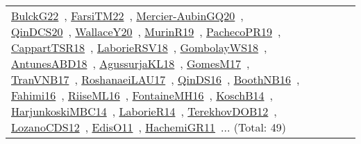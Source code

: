 {\begin{longtable}{lp{3cm}>{\raggedright\arraybackslash}p{6cm}>{\raggedright\arraybackslash}p{6cm}>{\raggedright\arraybackslash}p{8cm}}
\href{../works/BulckG22.pdf}{BulckG22}~\cite{BulckG22}, \href{../works/FarsiTM22.pdf}{FarsiTM22}~\cite{FarsiTM22}, \href{../works/Mercier-AubinGQ20.pdf}{Mercier-AubinGQ20}~\cite{Mercier-AubinGQ20}, \href{../works/QinDCS20.pdf}{QinDCS20}~\cite{QinDCS20}, \href{../works/WallaceY20.pdf}{WallaceY20}~\cite{WallaceY20}, \href{../works/MurinR19.pdf}{MurinR19}~\cite{MurinR19}, \href{../works/PachecoPR19.pdf}{PachecoPR19}~\cite{PachecoPR19}, \href{../works/CappartTSR18.pdf}{CappartTSR18}~\cite{CappartTSR18}, \href{../works/LaborieRSV18.pdf}{LaborieRSV18}~\cite{LaborieRSV18}, \href{../works/GombolayWS18.pdf}{GombolayWS18}~\cite{GombolayWS18}, \href{../works/AntunesABD18.pdf}{AntunesABD18}~\cite{AntunesABD18}, \href{../works/AgussurjaKL18.pdf}{AgussurjaKL18}~\cite{AgussurjaKL18}, \href{../works/GomesM17.pdf}{GomesM17}~\cite{GomesM17}, \href{../works/TranVNB17.pdf}{TranVNB17}~\cite{TranVNB17}, \href{../works/RoshanaeiLAU17.pdf}{RoshanaeiLAU17}~\cite{RoshanaeiLAU17}, \href{../works/QinDS16.pdf}{QinDS16}~\cite{QinDS16}, \href{../works/BoothNB16.pdf}{BoothNB16}~\cite{BoothNB16}, \href{../works/Fahimi16.pdf}{Fahimi16}~\cite{Fahimi16}, \href{../works/RiiseML16.pdf}{RiiseML16}~\cite{RiiseML16}, \href{../works/FontaineMH16.pdf}{FontaineMH16}~\cite{FontaineMH16}, \href{../works/KoschB14.pdf}{KoschB14}~\cite{KoschB14}, \href{../works/HarjunkoskiMBC14.pdf}{HarjunkoskiMBC14}~\cite{HarjunkoskiMBC14}, \href{../works/LaborieR14.pdf}{LaborieR14}~\cite{LaborieR14}, \href{../works/TerekhovDOB12.pdf}{TerekhovDOB12}~\cite{TerekhovDOB12}, \href{../works/LozanoCDS12.pdf}{LozanoCDS12}~\cite{LozanoCDS12}, \href{../works/EdisO11.pdf}{EdisO11}~\cite{EdisO11}, \href{../works/HachemiGR11.pdf}{HachemiGR11}~\cite{HachemiGR11}... (Total: 49)\\

\end{longtable}}

